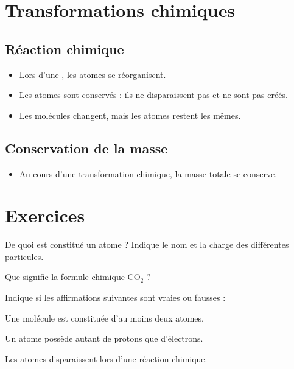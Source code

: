 \documentclass[12pt]{article}
\begin{document}
\section{Transformations chimiques}

\subsection{Réaction chimique}

\begin{itemize}
    \item Lors d’une , les atomes se réorganisent.
    \item Les atomes sont conservés : ils ne disparaissent pas et ne sont pas créés.
    \item Les molécules changent, mais les atomes restent les mêmes.
\end{itemize}

\subsection{Conservation de la masse}

\begin{itemize}
    \item Au cours d’une transformation chimique, la masse totale se conserve.
\end{itemize}

\section{Exercices}

\begin{exercice}{}{}
    De quoi est constitué un atome ? Indique le nom et la charge des différentes particules.
\end{exercice}

\begin{exercice}{}{}
    Que signifie la formule chimique \(\mathrm{CO_2}\) ?
\end{exercice}

\begin{exercice}{}{}
    Indique si les affirmations suivantes sont vraies ou fausses :
    \begin{enumeratebf}
        \item Une molécule est constituée d’au moins deux atomes.
        \item Un atome possède autant de protons que d’électrons.
        \item Les atomes disparaissent lors d’une réaction chimique.
    \end{enumeratebf}
\end{exercice}
\end{document}
